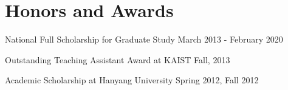 \section*{Honors and Awards}
\begin{description}
\item National Full Scholarship for Graduate Study \dotfill March 2013 - February 2020
\item Outstanding Teaching Assistant Award at KAIST \dotfill Fall, 2013
\item Academic Scholarship at Hanyang University \dotfill Spring 2012, Fall 2012
\end{description}
